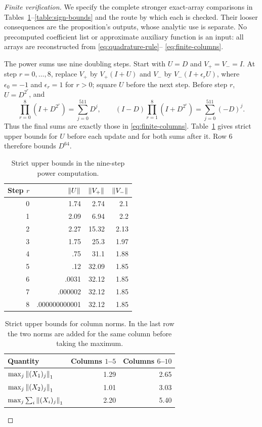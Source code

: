 \begin{proof}[Finite verification]
We specify the complete stronger exact-array comparisons in
Tables~\ref{table:power-bounds}--\ref{table:sign-bounds} and the route by
which each is checked.  Their looser consequences are the proposition's
outputs, whose analytic use is separate.  No precomputed coefficient list or approximate auxiliary function
is an input: all arrays are reconstructed from \eqref{eq:quadrature-rule}--
\eqref{eq:finite-columns}.

The power sums use nine doubling steps.  Start with $U=D$ and $V_+=V_-=I$.
At step $r=0,\ldots,8$, replace $V_+$ by $V_+(I+U)$ and $V_-$ by
$V_-(I+\epsilon_rU)$, where $\epsilon_0=-1$ and $\epsilon_r=1$ for $r>0$;
square $U$ before the next step.  Before step $r$, $U=D^{2^r}$, and
\[
 \prod_{r=0}^8(I+D^{2^r})=\sum_{j=0}^{511}D^j,
 \qquad
 (I-D)\prod_{r=1}^8(I+D^{2^r})=\sum_{j=0}^{511}(-D)^j.
\]
Thus the final sums are exactly those in \eqref{eq:finite-columns}.
Table~\ref{table:power-bounds} gives strict upper bounds for $U$ before each
update and for both sums after it.  Row 6 therefore bounds $D^{64}$.

\begin{table}[tb]
\centering
\caption{Strict upper bounds in the nine-step power computation.}
\label{table:power-bounds}
\begin{tabular}{@{}rrrr@{}}
\toprule
Step $r$&$\left\lVert U\right\rVert$&$\left\lVert V_+\right\rVert$&$\left\lVert V_-\right\rVert$\\
\midrule
0&1.74&2.74&2.1\\
1&2.09&6.94&2.2\\
2&2.27&15.32&2.13\\
3&1.75&25.3&1.97\\
4&.75&31.1&1.88\\
5&.12&32.09&1.85\\
6&.0031&32.12&1.85\\
7&.000002&32.12&1.85\\
8&.000000000001&32.12&1.85\\
\bottomrule
\end{tabular}
\end{table}

\begin{table}[tb]
\centering
\caption{Strict upper bounds for column norms.  In the last row the two
norms are added for the same column before taking the maximum.}
\label{table:column-bounds}
\begin{tabular}{@{}lrr@{}}
\toprule
Quantity&Columns $1$--$5$&Columns $6$--$10$\\
\midrule
$\max_j\left\lVert(X_1)_j\right\rVert_1$&1.29&2.65\\
$\max_j\left\lVert(X_2)_j\right\rVert_1$&1.01&3.03\\
$\max_j\sum_i\left\lVert(X_i)_j\right\rVert_1$&2.20&5.40\\
\bottomrule
\end{tabular}
\end{table}


\end{proof}
